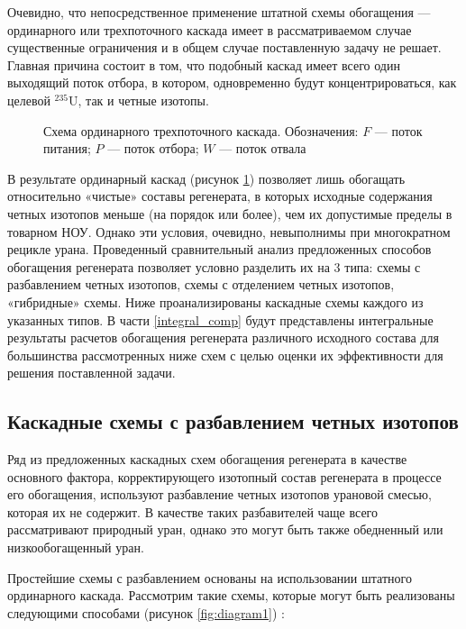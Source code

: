 Очевидно, что непосредственное применение штатной схемы обогащения --- ординарного или трехпоточного каскада имеет в рассматриваемом случае существенные ограничения и в общем случае поставленную задачу не решает. Главная причина состоит в том, что подобный каскад имеет всего один выходящий поток отбора, в котором, одновременно будут концентрироваться, как целевой  $^{235}$U, так и четные изотопы.

\begin{figure}[ht]
  \caption{Схема ординарного трехпоточного каскада. Обозначения: $F$ --- поток питания; $P$ --- поток отбора; $W$ --- поток отвала}\label{ordinary}
\end{figure}

В результате ординарный каскад (рисунок \ref{ordinary}) позволяет лишь обогащать относительно «чистые» составы регенерата, в которых исходные содержания четных изотопов меньше (на порядок или более), чем их допустимые пределы в товарном НОУ. Однако эти условия, очевидно, невыполнимы при многократном рецикле урана.
Проведенный сравнительный анализ предложенных способов обогащения регенерата позволяет условно разделить их на 3 типа: схемы с разбавлением четных изотопов,  схемы с отделением четных изотопов, «гибридные» схемы. 
Ниже проанализированы каскадные схемы каждого из указанных типов. В части \ref{integral_comp} будут представлены интегральные результаты расчетов обогащения регенерата различного исходного состава для большинства рассмотренных ниже схем с целью оценки их эффективности для решения поставленной задачи.

\subsection{Каскадные схемы с разбавлением четных изотопов}

Ряд из предложенных каскадных схем обогащения регенерата в качестве основного фактора, корректирующего изотопный состав регенерата в процессе его обогащения, используют разбавление четных изотопов урановой смесью, которая их не содержит. В качестве таких разбавителей чаще всего рассматривают природный уран, однако это могут быть также обедненный или низкообогащенный уран.

Простейшие схемы с разбавлением основаны на использовании штатного ординарного каскада. Рассмотрим такие схемы, которые могут быть реализованы следующими способами (рисунок \ref{fig:diagram1}) \cite{ksenof88,borodynyaIssledovanieProblemyVovlecheniya1989,sulaberidzeNekotoryhRazdelitelnyhProblemah2004,smirnovKaskadnyeShemyZadachah2012}:

